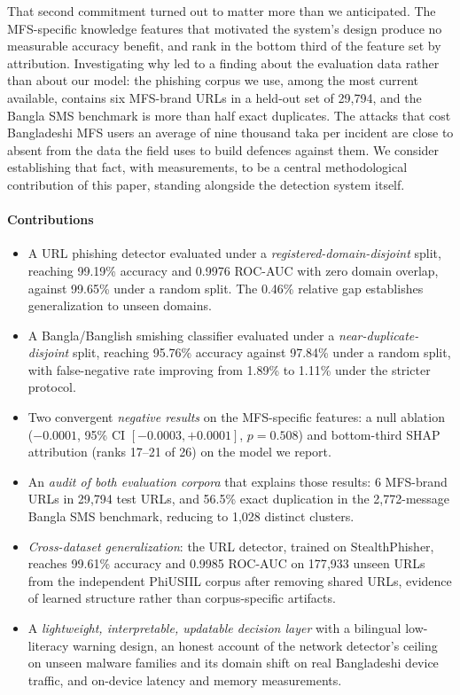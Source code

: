 \documentclass[preprint,12pt,number]{elsarticle}
\begin{document}
That second commitment turned out to matter more than we anticipated. The MFS-specific knowledge features that motivated the system's design produce no measurable accuracy benefit, and rank in the bottom third of the feature set by attribution. Investigating why led to a finding about the evaluation data rather than about our model: the phishing corpus we use, among the most current available, contains six MFS-brand URLs in a held-out set of 29{,}794, and the Bangla SMS benchmark is more than half exact duplicates. The attacks that cost Bangladeshi MFS users an average of nine thousand taka per incident are close to absent from the data the field uses to build defences against them. We consider establishing that fact, with measurements, to be a central methodological contribution of this paper, standing alongside the detection system itself.

\paragraph{Contributions}
\begin{itemize}
\item A URL phishing detector evaluated under a \emph{registered-domain-disjoint} split, reaching 99.19\% accuracy and 0.9976 ROC-AUC with zero domain overlap, against 99.65\% under a random split. The 0.46\% relative gap establishes generalization to unseen domains.
\item A Bangla/Banglish smishing classifier evaluated under a \emph{near-duplicate-disjoint} split, reaching 95.76\% accuracy against 97.84\% under a random split, with false-negative rate improving from 1.89\% to 1.11\% under the stricter protocol.
\item Two convergent \emph{negative results} on the MFS-specific features: a null ablation ($-0.0001$, 95\% CI $[-0.0003, +0.0001]$, $p=0.508$) and bottom-third SHAP attribution (ranks 17--21 of 26) on the model we report.
\item An \emph{audit of both evaluation corpora} that explains those results: 6 MFS-brand URLs in 29{,}794 test URLs, and 56.5\% exact duplication in the 2{,}772-message Bangla SMS benchmark, reducing to 1{,}028 distinct clusters.
\item \emph{Cross-dataset generalization}: the URL detector, trained on StealthPhisher, reaches 99.61\% accuracy and 0.9985 ROC-AUC on 177{,}933 unseen URLs from the independent PhiUSIIL corpus after removing shared URLs, evidence of learned structure rather than corpus-specific artifacts.
\item A \emph{lightweight, interpretable, updatable decision layer} with a bilingual low-literacy warning design, an honest account of the network detector's ceiling on unseen malware families and its domain shift on real Bangladeshi device traffic, and on-device latency and memory measurements.
\end{itemize}
\end{document}
